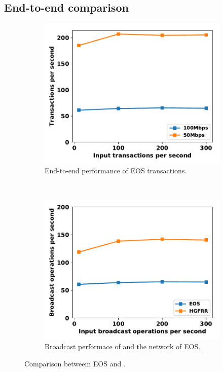 \subsection{End-to-end comparison}

\begin{figure}[ht]
  \centering
    \begin{subfigure}[b]{0.23\textwidth}
    \includegraphics[width=\textwidth]{figures/eos_hgfr_e2e_tps_on_input.pdf}
    \caption{End-to-end performance of EOS transactions.}
    \label{eos_hgfr_e2e_tps_on_input}
    \end{subfigure}
    ~
    \begin{subfigure}[b]{0.23\textwidth}
	  \includegraphics[width=\textwidth]{figures/eos_hgfr_micro_tps_on_input.pdf}
	  \caption{Broadcast performace of \xxx and the network of EOS.}
    \label{eos_hgfr_micro_tps_on_input}
    \end{subfigure}

	\caption{Comparison betweem EOS and \xxx.}
	\label{fig_eos_hgfr}
	\vspace{-0.5cm}
\end{figure}
  


